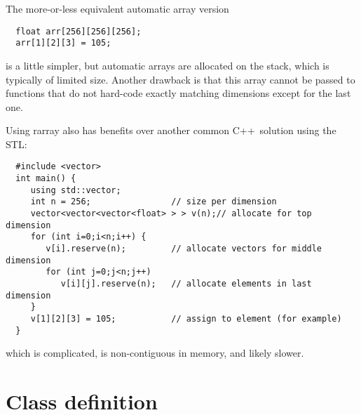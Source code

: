 \documentclass[11pt,twoside]{article}
\newcommand{\cxx}{C{++}}
\begin{document}
The more-or-less equivalent automatic array version 

\vspace{-5pt}\begin{framed}\vspace{-14pt}%
\begin{verbatim}
  float arr[256][256][256]; 
  arr[1][2][3] = 105;
\end{verbatim}
\vspace{-14pt}\end{framed}
\noindent
is a little simpler, but automatic arrays are allocated on the stack,
which is typically of limited size. Another drawback is that this array cannot be passed to functions that do
not hard-code exactly matching dimensions except for the last
one.

Using rarray also has benefits over another common \cxx\ 
solution using the STL:
\vspace{-5pt}\begin{framed}\vspace{-14pt}%
\begin{verbatim}
  #include <vector>
  int main() {
     using std::vector;
     int n = 256;                // size per dimension
     vector<vector<vector<float> > > v(n);// allocate for top dimension
     for (int i=0;i<n;i++) {
        v[i].reserve(n);         // allocate vectors for middle dimension
        for (int j=0;j<n;j++) 
           v[i][j].reserve(n);   // allocate elements in last dimension
     }
     v[1][2][3] = 105;           // assign to element (for example)
  }
\end{verbatim}%
\vspace{-14pt}\end{framed}\vspace{-8pt}
\noindent
which is complicated, is non-contiguous in memory, and likely
slower. 

\section{Class definition}
\end{document}
